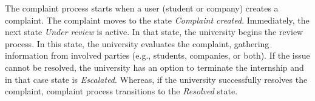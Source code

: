 The complaint process starts when a user (student or company) creates a complaint. The complaint moves to the state \textit{Complaint created}. Immediately, the next state \textit{Under review} is active. In that state, the university begins the review process. In this state, the university evaluates the complaint, gathering information from involved parties (e.g., students, companies, or both). If the issue cannot be resolved, the university has an option to terminate the internship and in that case state is \textit{Escalated}. Whereas, if the university successfully resolves the complaint, complaint process transitions to the \textit{Resolved} state.


